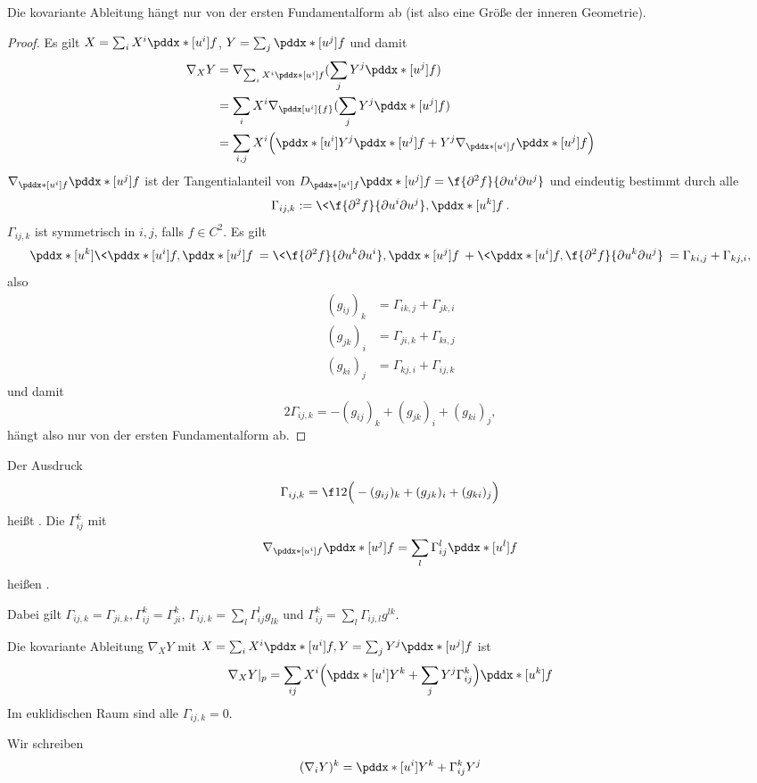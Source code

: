\begin{st}
	Die kovariante Ableitung hängt nur von der ersten Fundamentalform ab (ist also eine Größe der inneren Geometrie).
	\begin{proof}
		Es gilt $X = \sum_i X^i \pddx*[u^i]{f}$, $Y = \sum_j \pddx*[u^j]{f}$ und damit
		\begin{align*}
			\nabla_X Y &= \nabla_{\sum_i X^i \pddx*[u^i]{f}} (\sum_j Y^j \pddx*[u^j]{f}) \\
			&= \sum_i X^i \nabla_{\pddx[u^i]{f}} (\sum_j Y^j \pddx*[u^j]{f}) \\
			&= \sum_{i,j} X^i \Big( \pddx*[u^i]{Y^j} \pddx*[u^j]{f} + Y^j \nabla_{\pddx*[u^i]{f}} \pddx*[u^j]{f} \Big)
		\end{align*}
		$\nabla_{\pddx*[u^i]{f}} \pddx*[u^j]{f}$ ist der Tangentialanteil von $D_{\pddx*[u^i]{f}} \pddx*[u^j]{f} = \f{\partial^2 f}{\partial u^i \partial u^j}$ und eindeutig bestimmt durch alle
		\[
			\Gamma_{ij,k} := \< \f{\partial^2 f}{\partial u^i \partial u^j}, \pddx*[u^k]{f} \>.
		\]
		$\Gamma_{ij,k}$ ist symmetrisch in $i,j$, falls $f \in C^2$.
		Es gilt
		\[
			\pddx*[u^k] \< \pddx*[u^i]{f}, \pddx*[u^j]{f} \>
		= \< \f{\partial^2 f}{\partial u^k \partial u^i}, \pddx*[u^j]{f} \>
			+ \< \pddx*[u^i]{f}, \f{\partial^2 f}{\partial u^k \partial u^j} \>
			= \Gamma_{ki,j} + \Gamma_{kj,i},
		\]
		also
		\begin{align*}
			(g_{ij})_k &= \Gamma_{ik,j} + \Gamma_{jk,i} \\
			(g_{jk})_i &= \Gamma_{ji,k} + \Gamma_{ki,j} \\
			(g_{ki})_j &= \Gamma_{kj,i} + \Gamma_{ij,k}
		\end{align*}
		und damit
		\[
			2 \Gamma_{ij,k} = - (g_{ij})_k + (g_{jk})_i + (g_{ki})_j,
		\]
		hängt also nur von der ersten Fundamentalform ab.
	\end{proof}
\end{st}

\begin{df}
	Der Ausdruck
	\[
		\Gamma_{ij,k} = \f 12 \Big( - (g_{ij})_k + (g_{jk})_i + (g_{ki})_j \Big)
	\]
	heißt .
	Die $\Gamma_{ij}^k$ mit
	\[
		\nabla_{\pddx*[u^i]{f}} \pddx*[u^j]{f}
		= \sum_l \Gamma_{ij}^l \pddx*[u^l]{f}
	\]
	heißen .

	Dabei gilt $\Gamma_{ij,k} = \Gamma_{ji,k}, \Gamma_{ij}^k = \Gamma_{ji}^k$, $\Gamma_{ij,k} = \sum_l \Gamma_{ij}^l g_{lk}$ und $\Gamma_{ij}^k = \sum_l \Gamma_{ij,l} g^{lk}$.

	Die kovariante Ableitung $\nabla_X Y$ mit $X = \sum_i X^i \pddx*[u^i]{f}, Y = \sum_j Y^j \pddx*[u^j]{f}$ ist
	\[
		\nabla_X Y|_p = \sum_{ij} X^i \Big( \pddx*[u^i]{Y^k} + \sum_j Y^j \Gamma_{ij}^k \Big) \pddx*[u^k]{f}
	\]
	Im euklidischen Raum sind alle $\Gamma_{ij,k} = 0$.

	Wir schreiben
	\[
		(\nabla_i Y)^k
		= \pddx*[u^i]{Y^k} + \Gamma_{ij}^k Y^j
	\]
\end{df}

